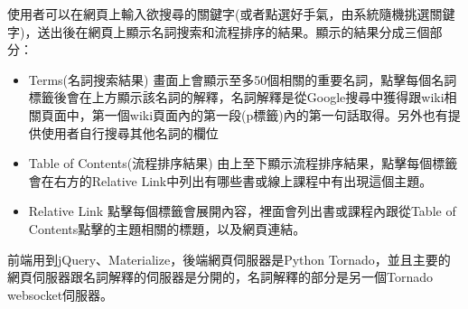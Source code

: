 使用者可以在網頁上輸入欲搜尋的關鍵字(或者點選好手氣，由系統隨機挑選關鍵字)，送出後在網頁上顯示名詞搜索和流程排序的結果。顯示的結果分成三個部分：
\begin{itemize}
	\item Terms(名詞搜索結果)
		畫面上會顯示至多50個相關的重要名詞，點擊每個名詞標籤後會在上方顯示該名詞的解釋，名詞解釋是從Google搜尋中獲得跟wiki相關頁面中，第一個wiki頁面內的第一段(p標籤)內的第一句話取得。另外也有提供使用者自行搜尋其他名詞的欄位
	\item Table of Contents(流程排序結果)
		由上至下顯示流程排序結果，點擊每個標籤會在右方的Relative Link中列出有哪些書或線上課程中有出現這個主題。
	\item Relative Link
		點擊每個標籤會展開內容，裡面會列出書或課程內跟從Table of Contents點擊的主題相關的標題，以及網頁連結。
\end{itemize}

前端用到jQuery、Materialize，後端網頁伺服器是Python Tornado，並且主要的網頁伺服器跟名詞解釋的伺服器是分開的，名詞解釋的部分是另一個Tornado websocket伺服器。